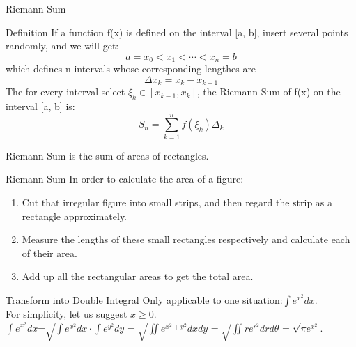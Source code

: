 
\begin{frame}{Riemann Sum}
    \begin{block}{Definition}
        If a function f(x) is defined on the interval [a, b], insert several points randomly, and we will get:
        $$a=x_0<x_1<\cdots<x_n=b$$
        which defines n intervals whose corresponding lengthes are $$\Delta x_k=x_k-x_{k-1}$$
        The for every interval select $\xi_k\in [x_{k-1},x_k]$, the Riemann Sum  of f(x) on the interval [a, b] is: $$S_n=\sum\limits_{k=1}^n f(\xi_k) \Delta_k$$
    \end{block}
    Riemann Sum is the sum of areas of rectangles.
\end{frame}

\begin{frame}{Riemann Sum}
    In order to calculate the area of a figure:
    \begin{enumerate}
        \item Cut that irregular figure into small strips, and then regard the strip as a rectangle approximately.
        \item Measure the lengths of these small rectangles respectively and calculate each of their area.
        \item Add up all the rectangular areas to get the total area.
    \end{enumerate}
\end{frame}


\begin{frame}{Transform into Double Integral}
    Only applicable to one situation:$\int e^{x^2}dx$.\\
    For simplicity, let us suggest $x\geq0$.\\
    $\int e^{x^2}dx$=$\sqrt{\int e^{x^2}dx\cdot\int e^{y^2}dy}=\sqrt{\iint e^{x^2+y^2}dxdy}=\sqrt{\iint re^{r^2}drd\theta}=\sqrt{\pi e^{x^2}}$.
\end{frame}


